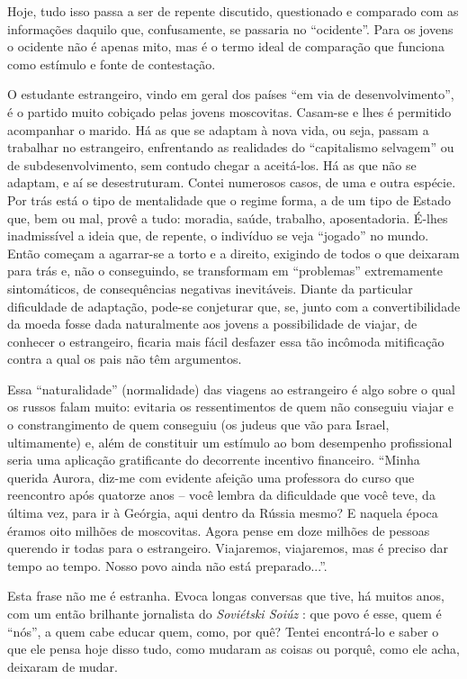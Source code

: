 Hoje, tudo isso passa a ser de repente discutido, questionado e
comparado com as informações daquilo que, confusamente, se passaria no
``ocidente''. Para os jovens o ocidente não é apenas mito, mas é o termo
ideal de comparação que funciona como estímulo e fonte de contestação.

O estudante estrangeiro, vindo em geral dos países ``em via de
desenvolvimento'', é o partido muito cobiçado pelas jovens moscovitas.
Casam-se e lhes é permitido acompanhar o marido. Há as que se adaptam à
nova vida, ou seja, passam a trabalhar no estrangeiro, enfrentando as
realidades do ``capitalismo selvagem'' ou de subdesenvolvimento, sem
contudo chegar a aceitá-los. Há as que não se adaptam, e aí se
desestruturam. Contei numerosos casos, de uma e outra espécie. Por trás
está o tipo de mentalidade que o regime forma, a de um tipo de Estado
que, bem ou mal, provê a tudo: moradia, saúde, trabalho, aposentadoria.
É-lhes inadmissível a ideia que, de repente, o indivíduo se veja
``jogado'' no mundo. Então começam a agarrar-se a torto e a direito,
exigindo de todos o que deixaram para trás e, não o conseguindo, se
transformam em ``problemas'' extremamente sintomáticos, de consequências
negativas inevitáveis. Diante da particular dificuldade de adaptação,
pode-se conjeturar que, se, junto com a convertibilidade da moeda fosse
dada naturalmente aos jovens a possibilidade de viajar, de conhecer o
estrangeiro, ficaria mais fácil desfazer essa tão incômoda mitificação
contra a qual os pais não têm argumentos.

Essa ``naturalidade'' (normalidade) das viagens ao estrangeiro é algo
sobre o qual os russos falam muito: evitaria os ressentimentos de quem
não conseguiu viajar e o constrangimento de quem conseguiu (os judeus
que vão para Israel, ultimamente) e, além de constituir um estímulo ao
bom desempenho profissional seria uma aplicação gratificante do
decorrente incentivo financeiro. ``Minha querida Aurora, diz-me com
evidente afeição uma professora do curso que reencontro após quatorze
anos -- você lembra da dificuldade que você teve, da última vez, para ir
à Geórgia, aqui dentro da Rússia mesmo? E naquela época éramos oito
milhões de moscovitas. Agora pense em doze milhões de pessoas querendo
ir todas para o estrangeiro. Viajaremos, viajaremos, mas é preciso dar
tempo ao tempo. Nosso povo ainda não está preparado...''.

Esta frase não me é estranha. Evoca longas conversas que tive, há muitos
anos, com um então brilhante jornalista do \emph{Soviétski Soiúz} : que
povo é esse, quem é ``nós'', a quem cabe educar quem, como, por quê?
Tentei encontrá-lo e saber o que ele pensa hoje disso tudo, como mudaram
as coisas ou porquê, como ele acha, deixaram de mudar.

